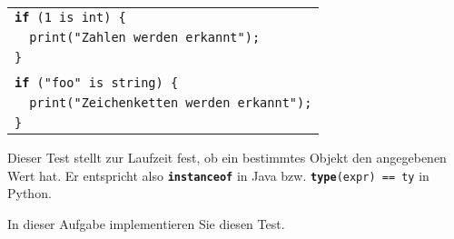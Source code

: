 \documentclass[11pt,a4paper]{article}
\newcommand{\Cty}[1]{\textcolor{dblue}{\texttt{#1}}}
\newcommand{\Ckw}[1]{\textbf{\texttt{#1}}}
\begin{document}
\begin{tabular}{l}
\texttt{\textbf{if} (1 is \Cty{int}) \{}\\
\texttt{\ \ print({"{}}Zahlen werden erkannt");}\\
\texttt{\}}\\
\\
\texttt{\textbf{if} ("foo"{} is \Cty{string}) \{}\\
\texttt{\ \ print({"{}}Zeichenketten werden erkannt");}\\
\texttt{\}}\\
\end{tabular}

Dieser Test stellt zur Laufzeit fest, ob ein bestimmtes Objekt den angegebenen Wert hat.  Er entspricht also \Ckw{instanceof} in Java bzw.\@
\texttt{\Ckw{type}(expr) == ty} in Python.

In dieser Aufgabe implementieren Sie diesen Test.
\end{document}
